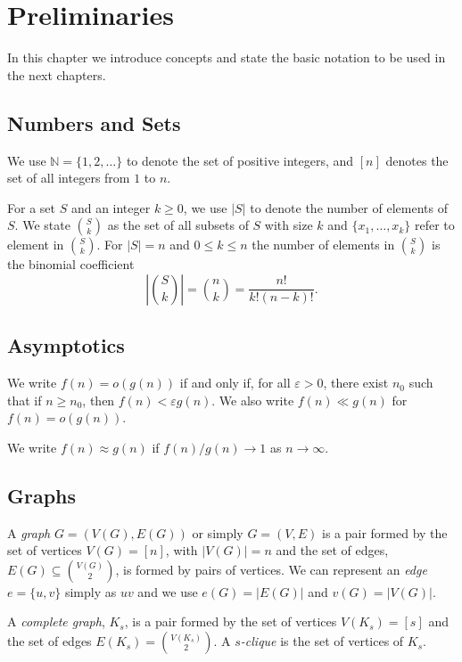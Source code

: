 \documentclass[12pt,twoside,a4paper,bibliography=totocnumbered]{book}
\numberwithin{equation}{section}
\theoremstyle{remark}
\begin{document}

\chapter{Preliminaries}
In this chapter we introduce concepts and state the basic notation to be used in the next chapters.

\section{Numbers and Sets}
We use $\mathbb{N} = \{1,2,\ldots\}$ to denote the set of positive integers, and $[n]$ denotes the set of all integers from $1$ to $n$. 

For a set $S$ and an integer $k \geq 0$, we use $|S|$ to denote the number of elements of $S$. We state $\binom{S}{k}$ as the set of all subsets of $S$ with size $k$ and $\{x_1,\ldots,x_k\}$ refer to element in $\binom{S}{k}$. For $|S| = n$ and $0 \leq k \leq n$ the number of elements in $\binom{S}{k}$ is the binomial coefficient
$$ \left| \binom{S}{k} \right| = \binom{n}{k} = \frac{n!}{k!(n-k)!}.$$
 
\section{Asymptotics}
We write $f(n) = o(g(n))$ if and only if, for all $\varepsilon > 0$, there exist $n_0$ such that if $n \geq n_0$, then $f(n) < \varepsilon g(n)$. We also write $f(n) \ll g(n)$ for $f(n) = o(g(n))$.

We write $f(n) \approx g(n)$ if $f(n)/g(n) \rightarrow 1$ as $n \rightarrow \infty$.

\section{Graphs}
A \emph{graph} $G = (V(G), E(G))$ or simply $G = (V, E)$ is a pair formed by the set of vertices $V(G) = [n]$, with $|V(G)|=n$ and the set of edges, $E(G) \subseteq \binom{V(G)}{2}$, is formed by pairs of vertices. We can represent an \emph{edge} $e = \{u,v\}$ simply as $uv$ and we use $e(G) = |E(G)|$ and $v(G) = |V(G)|$.

A \emph{complete graph}, $K_s$, is a pair formed by the set of vertices $V(K_s) =  [s]$ and the set of edges $E(K_s) = \binom{V(K_s)}{2}$. A \emph{$s$-clique} is the set of vertices of $K_s$.
\end{document}
